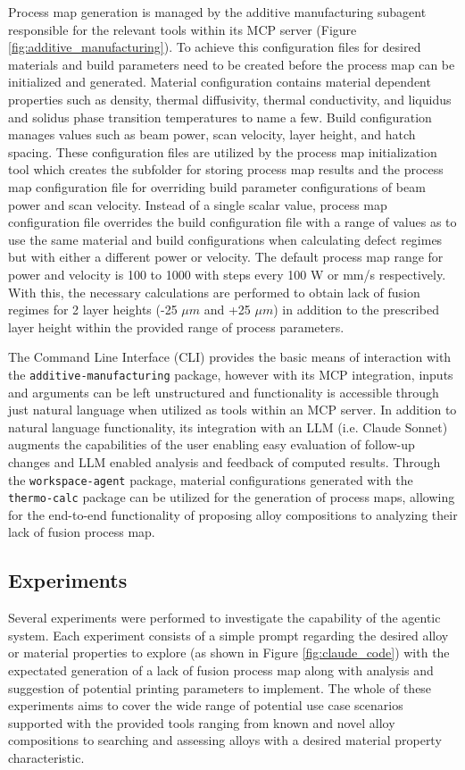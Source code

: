 Process map generation is managed by the additive manufacturing subagent
responsible for the relevant tools within its MCP server (Figure
\ref{fig:additive_manufacturing}). To achieve this configuration files for
desired materials and build parameters need to be created before the process map
can be initialized and generated. Material configuration contains material
dependent properties such as density, thermal diffusivity, thermal conductivity,
and liquidus and solidus phase transition temperatures to name a few. Build
configuration manages values such as beam power, scan velocity, layer height,
and hatch spacing. These configuration files are utilized by the process map
initialization tool which creates the subfolder for storing process map results
and the process map configuration file for overriding build parameter
configurations of beam power and scan velocity. Instead of a single scalar
value, process map configuration file overrides the build configuration file
with a range of values as to use the same material and build configurations when
calculating defect regimes but with either a different power or velocity. The
default process map range for power and velocity is 100 to 1000 with steps every
100 W or mm/s respectively. With this, the necessary calculations are performed
to obtain lack of fusion regimes for 2 layer heights (-25 $\mu m$ and +25 $\mu
m$) in addition to the prescribed layer height within the provided range of
process parameters.

The Command Line Interface (CLI) provides the basic means of interaction with
the \texttt{additive-manufacturing} package, however with its MCP integration,
inputs and arguments can be left unstructured and functionality is accessible
through just natural language when utilized as tools within an MCP server. In
addition to natural language functionality, its integration with an LLM (i.e.
Claude Sonnet) augments the capabilities of the user enabling easy evaluation of
follow-up changes and LLM enabled analysis and feedback of computed results.
Through the \texttt{workspace-agent} package, material configurations generated
with the \texttt{thermo-calc} package can be utilized for the generation of
process maps, allowing for the end-to-end functionality of proposing alloy
compositions to analyzing their lack of fusion process map.

\subsection{Experiments}
Several experiments were performed to investigate the capability of the agentic
system. Each experiment consists of a simple prompt regarding the desired alloy
or material properties to explore (as shown in Figure \ref{fig:claude_code})
with the expectated generation of a lack of fusion process map along with
analysis and suggestion of potential printing parameters to implement. The whole
of these experiments aims to cover the wide range of potential use case
scenarios supported with the provided tools ranging from known and novel
alloy compositions to searching and assessing alloys with a desired material property
characteristic.

